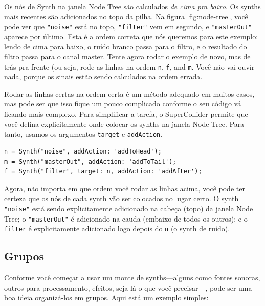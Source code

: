 Os nós de Synth na janela Node Tree são calculados \emph{de cima pra baixo}. Os synths mais recentes são adicionados no topo da pilha. Na figura \ref{fig:node-tree}, você pode ver que \texttt{"noise"} está no topo, \texttt{"filter"} vem em segundo, e \texttt{"masterOut"} aparece por último. Esta é a ordem correta que nós queremos para este exemplo: lendo de cima para baixo, o ruído branco passa para o filtro, e o resultado do filtro passa para o canal master. Tente agora rodar o exemplo de novo, mas de trás pra frente (ou seja, rode as linhas na ordem \texttt{n}, \texttt{f}, and \texttt{m}. Você não vai ouvir nada, porque os sinais estão sendo calculados na ordem errada.

Rodar as linhas certas na ordem certa é um método adequado em muitos casos, mas pode ser que isso fique um pouco complicado conforme o seu código vá ficando mais complexo. Para simplificar a tarefa, o SuperCollider permite que você defina explicitamente onde colocar os synths na janela Node Tree. Para tanto, usamos os argumentos \texttt{target} e \texttt{addAction}.

\begin{lstlisting}[style=SuperCollider-IDE, basicstyle=\scttfamily\footnotesize]
n = Synth("noise", addAction: 'addToHead');
m = Synth("masterOut", addAction: 'addToTail');
f = Synth("filter", target: n, addAction: 'addAfter');
\end{lstlisting}

Agora, não importa em que ordem você rodar as linhas acima, você pode ter certeza que os nós de cada synth vão ser colocados no lugar certo. O synth \texttt{"noise"} está sendo explicitamente adicionado na cabeça (topo) da janela Node Tree; o \texttt{"masterOut"} é adicionado na cauda (embaixo de todos os outros); e o \texttt{filter} é explicitamente adicionado logo depois do \texttt{n} (o synth de ruído).

\subsection{Grupos}

Conforme você começar a usar um monte de synths---alguns como fontes sonoras, outros para processamento, efeitos, seja lá o que você precisar---, pode ser uma boa ideia organizá-los em grupos. Aqui está um exemplo simples:


